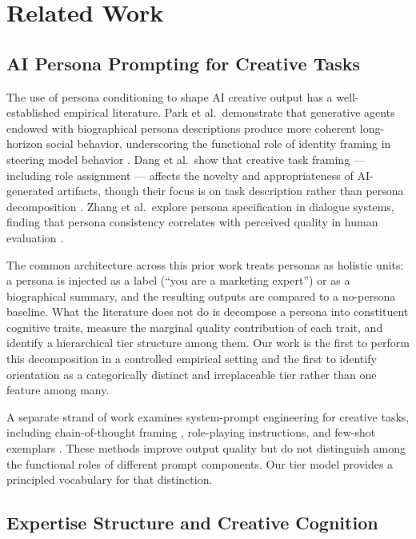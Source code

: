 \section{Related Work}
\label{sec:related}

\subsection{AI Persona Prompting for Creative Tasks}

The use of persona conditioning to shape AI creative output has a well-established
empirical literature. Park et al.\ demonstrate that generative agents endowed with
biographical persona descriptions produce more coherent long-horizon social behavior,
underscoring the functional role of identity framing in steering model behavior
\cite{park2023generative}. Dang et al.\ show that creative task framing --- including
role assignment --- affects the novelty and appropriateness of AI-generated artifacts,
though their focus is on task description rather than persona decomposition
\cite{dang2023creative}. Zhang et al.\ explore persona specification in dialogue
systems, finding that persona consistency correlates with perceived quality in
human evaluation \cite{zhang2018personas}.

The common architecture across this prior work treats personas as holistic units: a
persona is injected as a label (``you are a marketing expert'') or as a biographical
summary, and the resulting outputs are compared to a no-persona baseline. What the
literature does not do is decompose a persona into constituent cognitive traits,
measure the marginal quality contribution of each trait, and identify a hierarchical
tier structure among them. Our work is the first to perform this decomposition in a
controlled empirical setting and the first to identify orientation as a categorically
distinct and irreplaceable tier rather than one feature among many.

A separate strand of work examines system-prompt engineering for creative tasks,
including chain-of-thought framing \cite{wei2022chain}, role-playing instructions, and
few-shot exemplars \cite{brown2020language}. These methods improve output quality but
do not distinguish among the functional roles of different prompt components. Our tier
model provides a principled vocabulary for that distinction.

\subsection{Expertise Structure and Creative Cognition}

